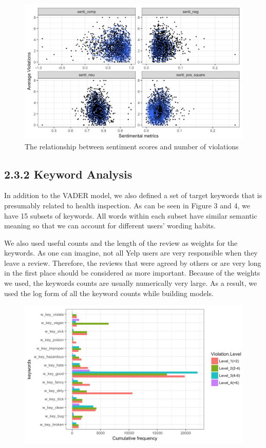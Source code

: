 \documentclass[letterpaper, 11 pt, conference]{ieeeconf}
\begin{document}
\begin{figure}[h]
	\centering
    \includegraphics[scale = 0.3]{senti}
    \caption{The relationship between sentiment scores and number of violations}
\end{figure}


\subsection*{2.3.2 Keyword Analysis}
In addition to the VADER model, we also defined a set of target keywords that is presumably related to health inspection. As can be seen in Figure 3 and 4, we have 15 subsets of keywords. All words within each subset have similar semantic meaning so that we can account for different users' wording habits. 

We also used useful counts and the length of the review as weights for the keywords. As one can imagine, not all Yelp users are very responsible when they leave a review. Therefore, the reviews that were agreed by others or are very long in the first place should be considered as more important. Because of the weights we used, the keywords counts are usually numerically very large. As a result, we used the log form of all the keyword counts while building models. 

\begin{figure}[h]
	\centering
    \includegraphics[scale = 0.3]{keyword}
    \caption{}
\end{figure}
\end{document}

